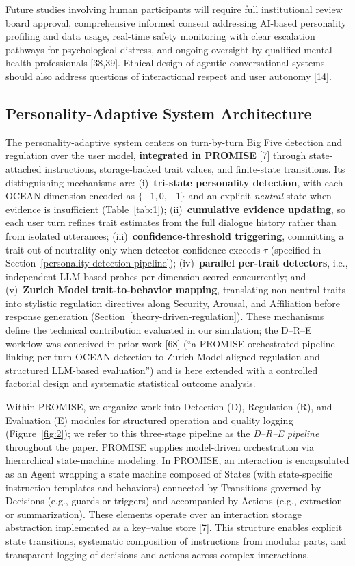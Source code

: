\documentclass[apajournal,article,submit,moreauthors]{Definitions/mdpi}
\begin{document}
Future studies involving human participants will require full institutional review board approval, comprehensive informed consent addressing AI-based personality profiling and data usage, real-time safety monitoring with clear escalation pathways for psychological distress, and ongoing oversight by qualified mental health professionals {[}38,39{]}. Ethical design of agentic conversational systems should also address questions of interactional respect and user autonomy {[}14{]}.

\subsection{Personality-Adaptive System Architecture}\label{personality-adaptive-system-architecture}

The personality-adaptive system centers on turn-by-turn Big Five detection and regulation over the user model, \textbf{integrated in PROMISE} {[}7{]} through state-attached instructions, storage-backed trait values, and finite-state transitions. Its distinguishing mechanisms are: (i)~\textbf{tri-state personality detection}, with each OCEAN dimension encoded as $\{-1, 0, +1\}$ and an explicit \emph{neutral} state when evidence is insufficient (Table~\ref{tab:1}); (ii)~\textbf{cumulative evidence updating}, so each user turn refines trait estimates from the full dialogue history rather than from isolated utterances; (iii)~\textbf{confidence-threshold triggering}, committing a trait out of neutrality only when detector confidence exceeds $\tau$ (specified in Section~\ref{personality-detection-pipeline}); (iv)~\textbf{parallel per-trait detectors}, i.e., independent LLM-based probes per dimension scored concurrently; and (v)~\textbf{Zurich Model trait-to-behavior mapping}, translating non-neutral traits into stylistic regulation directives along Security, Arousal, and Affiliation before response generation (Section~\ref{theory-driven-regulation}). These mechanisms define the technical contribution evaluated in our simulation; the D--R--E workflow was conceived in prior work {[}68{]} (``a PROMISE-orchestrated pipeline linking per-turn OCEAN detection to Zurich Model-aligned regulation and structured LLM-based evaluation'') and is here extended with a controlled factorial design and systematic statistical outcome analysis.

Within PROMISE, we organize work into Detection (D), Regulation (R), and Evaluation (E) modules for structured operation and quality logging (Figure~\ref{fig:2}); we refer to this three-stage pipeline as the \emph{D--R--E pipeline} throughout the paper. PROMISE supplies model-driven orchestration via hierarchical state-machine modeling. In PROMISE, an interaction is encapsulated as an Agent wrapping a state machine composed of States (with state-specific instruction templates and behaviors) connected by Transitions governed by Decisions (e.g., guards or triggers) and accompanied by Actions (e.g., extraction or summarization). These elements operate over an interaction storage abstraction implemented as a key--value store {[}7{]}. This structure enables explicit state transitions, systematic composition of instructions from modular parts, and transparent logging of decisions and actions across complex interactions.
\end{document}
